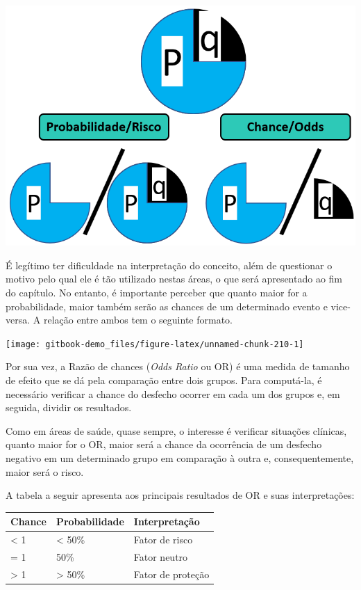 \documentclass[
]{book}
\begin{document}
\includegraphics{./img/cap_reg_log_odds.png}

É legítimo ter dificuldade na interpretação do conceito, além de questionar o motivo pelo qual ele é tão utilizado nestas áreas, o que será apresentado ao fim do capítulo. No entanto, é importante perceber que quanto maior for a probabilidade, maior também serão as chances de um determinado evento e vice-versa. A relação entre ambos tem o seguinte formato.

\begin{center}\texttt{[image: gitbook-demo\_files/figure-latex/unnamed-chunk-210-1]} \end{center}

Por sua vez, a Razão de chances (\emph{Odds Ratio} ou OR) é uma medida de tamanho de efeito que se dá pela comparação entre dois grupos. Para computá-la, é necessário verificar a chance do desfecho ocorrer em cada um dos grupos e, em seguida, dividir os resultados.

Como em áreas de saúde, quase sempre, o interesse é verificar situações clínicas, quanto maior for o OR, maior será a chance da ocorrência de um desfecho negativo em um determinado grupo em comparação à outra e, consequentemente, maior será o risco.

A tabela a seguir apresenta aos principais resultados de OR e suas interpretações:

\begin{longtable}[]{@{}lll@{}}
\toprule
Chance & Probabilidade & Interpretação\tabularnewline
\midrule
\endhead
\textless{} 1 & \textless{} 50\% & Fator de risco\tabularnewline
= 1 & 50\% & Fator neutro\tabularnewline
\textgreater{} 1 & \textgreater{} 50\% & Fator de proteção\tabularnewline
\bottomrule
\end{longtable}
\end{document}

